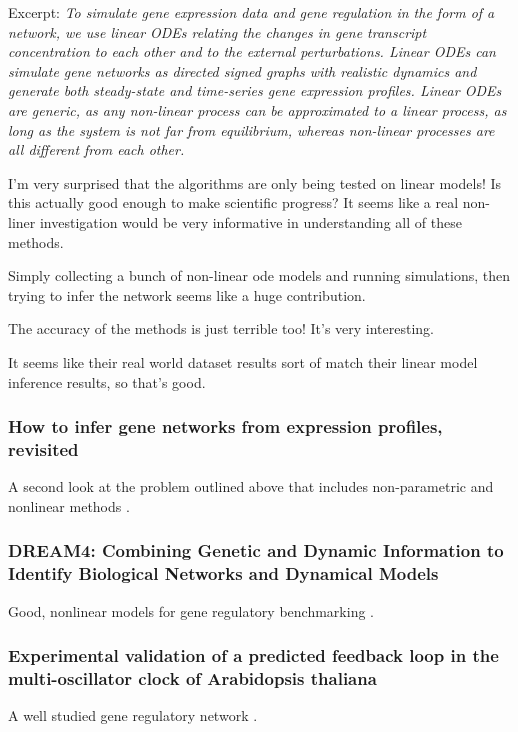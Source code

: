 \documentclass{article}
\begin{document}
        Excerpt: \textit{To simulate gene expression data and gene regulation in
        the form of a network, we use linear ODEs relating the changes in gene
        transcript concentration to each other and to the external
        perturbations. Linear ODEs can simulate gene networks as directed signed
        graphs with realistic dynamics and generate both steady-state and
        time-series gene expression profiles. Linear ODEs are generic, as any
        non-linear process can be approximated to a linear process, as long as
        the system is not far from equilibrium, whereas non-linear processes are
        all different from each other.}
        
        I'm very surprised that the algorithms are only being tested on linear
        models! Is this actually good enough to make scientific progress? It
        seems like a real non-liner investigation would be very informative in
        understanding all of these methods.

        Simply collecting a bunch of non-linear ode models and running
        simulations, then trying to infer the network seems like a huge
        contribution.
        
        The accuracy of the methods is just terrible too! It's very interesting.

        It seems like their real world dataset results sort of match their
        linear model inference results, so that's good.

    \subsubsection*{How to infer gene networks from expression profiles, revisited}
        A second look at the problem outlined above that includes non-parametric
        and nonlinear methods \cite{penfold2011infer}.

    \subsubsection*{DREAM4: Combining Genetic and Dynamic Information to    Identify Biological Networks and Dynamical Models}
        Good, nonlinear models for gene regulatory benchmarking \cite{greenfield2010dream4}.

    \subsubsection*{Experimental validation of a predicted feedback loop in the multi-oscillator clock of Arabidopsis thaliana}
        A well studied gene regulatory network \cite{locke2006experimental}.
\end{document}
